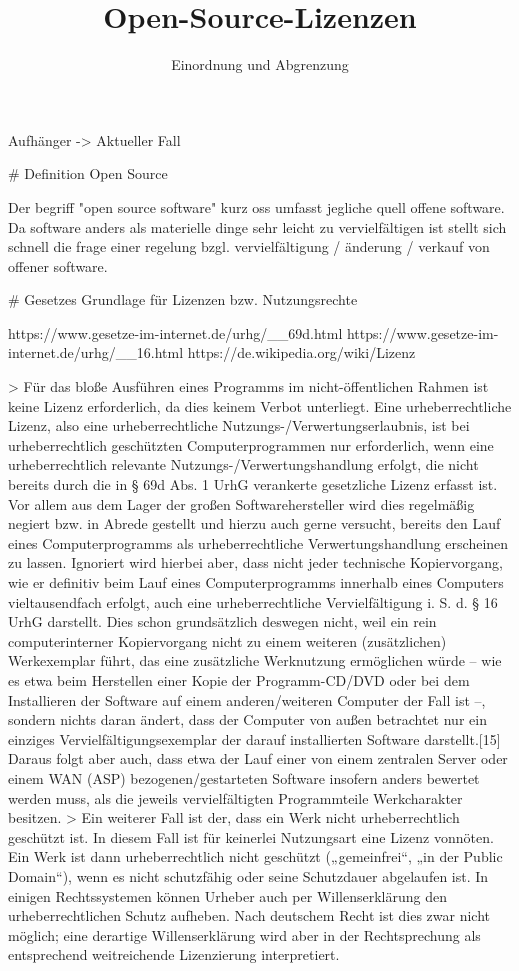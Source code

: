 \documentclass{beamer}
\title{Open-Source-Lizenzen}
\subtitle{Einordnung und Abgrenzung}
\begin{document}
\maketitle

Aufhänger -> Aktueller Fall

# Definition Open Source

Der begriff "open source software" kurz oss umfasst jegliche quell offene
software. Da software anders als materielle dinge sehr leicht zu
vervielfältigen ist stellt sich schnell die frage einer regelung bzgl.
vervielfältigung / änderung / verkauf von offener software.

# Gesetzes Grundlage für Lizenzen bzw. Nutzungsrechte

https://www.gesetze-im-internet.de/urhg/__69d.html
https://www.gesetze-im-internet.de/urhg/__16.html
https://de.wikipedia.org/wiki/Lizenz

> Für das bloße Ausführen eines Programms im nicht-öffentlichen Rahmen ist keine Lizenz erforderlich, da dies keinem Verbot unterliegt. Eine urheberrechtliche Lizenz, also eine urheberrechtliche Nutzungs-/Verwertungserlaubnis, ist bei urheberrechtlich geschützten Computerprogrammen nur erforderlich, wenn eine urheberrechtlich relevante Nutzungs-/Verwertungshandlung erfolgt, die nicht bereits durch die in § 69d Abs. 1 UrhG verankerte gesetzliche Lizenz erfasst ist. Vor allem aus dem Lager der großen Softwarehersteller wird dies regelmäßig negiert bzw. in Abrede gestellt und hierzu auch gerne versucht, bereits den Lauf eines Computerprogramms als urheberrechtliche Verwertungshandlung erscheinen zu lassen. Ignoriert wird hierbei aber, dass nicht jeder technische Kopiervorgang, wie er definitiv beim Lauf eines Computerprogramms innerhalb eines Computers vieltausendfach erfolgt, auch eine urheberrechtliche Vervielfältigung i. S. d. § 16 UrhG darstellt. Dies schon grundsätzlich deswegen nicht, weil ein rein computerinterner Kopiervorgang nicht zu einem weiteren (zusätzlichen) Werkexemplar führt, das eine zusätzliche Werknutzung ermöglichen würde – wie es etwa beim Herstellen einer Kopie der Programm-CD/DVD oder bei dem Installieren der Software auf einem anderen/weiteren Computer der Fall ist –, sondern nichts daran ändert, dass der Computer von außen betrachtet nur ein einziges Vervielfältigungsexemplar der darauf installierten Software darstellt.[15] Daraus folgt aber auch, dass etwa der Lauf einer von einem zentralen Server oder einem WAN (ASP) bezogenen/gestarteten Software insofern anders bewertet werden muss, als die jeweils vervielfältigten Programmteile Werkcharakter besitzen.
> Ein weiterer Fall ist der, dass ein Werk nicht urheberrechtlich geschützt ist. In diesem Fall ist für keinerlei Nutzungsart eine Lizenz vonnöten. Ein Werk ist dann urheberrechtlich nicht geschützt („gemeinfrei“, „in der Public Domain“), wenn es nicht schutzfähig oder seine Schutzdauer abgelaufen ist. In einigen Rechtssystemen können Urheber auch per Willenserklärung den urheberrechtlichen Schutz aufheben. Nach deutschem Recht ist dies zwar nicht möglich; eine derartige Willenserklärung wird aber in der Rechtsprechung als entsprechend weitreichende Lizenzierung interpretiert.
\end{document}
